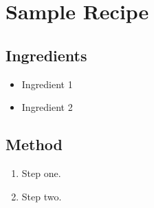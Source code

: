 \section{Sample Recipe}\label{sec:sample_recipe}
\subsection*{Ingredients}
\begin{itemize}
  \item Ingredient 1
  \item Ingredient 2
\end{itemize}
\subsection*{Method}
\begin{enumerate}
  \item Step one.
  \item Step two.
\end{enumerate}
\clearpage
